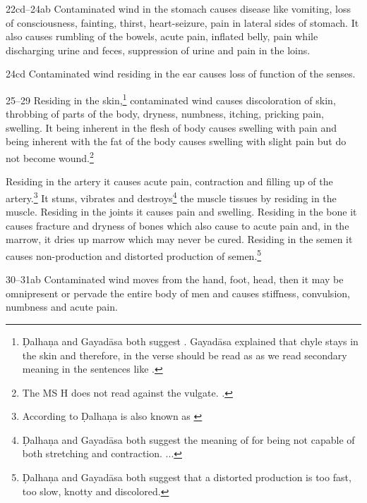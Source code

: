 \begin{translation}
\item[22cd--24ab] Contaminated wind in the stomach causes disease like
vomiting, loss of consciousness, fainting, thirst, heart-seizure, pain in
lateral sides of stomach. It also causes rumbling of the bowels, acute
pain, inflated belly, pain while discharging urine and feces, suppression
of urine and pain in the loins.

\item[24cd]Contaminated wind residing in the ear causes loss of function of the 
senses.

\item[25--29] Residing in the skin,\footnote{Ḍalhaṇa and Gayadāsa both 
suggest . Gayadāsa explained that chyle stays in the skin and 
therefore, in the verse  should be read as  as we read 
secondary meaning in the sentences like .} contaminated 
wind causes discoloration of skin, throbbing of parts of the body, dryness, 
numbness, itching, pricking pain, swelling. It being inherent in the flesh of body 
causes swelling with pain and being inherent with the fat of the body causes 
swelling with slight pain but do not become wound.\footnote{The MS H does 
not 
read  against the vulgate. 
\citep[261]{vulgate}.}

Residing in the artery it causes acute pain, contraction and filling up of the 
artery.\footnote{According to Ḍalhaṇa  is also known as 
 \citep[262]{vulgate}} It stuns, vibrates and 
destroys\footnote{Ḍalhaṇa and Gayadāsa both suggest the meaning of 
 for being not capable of both stretching and contraction. 
 \citep[262]{vulgate} 
...} 
the muscle tissues by residing in the muscle. Residing in the joints it causes 
pain 
and swelling. Residing in the bone it causes fracture and dryness of bones 
which 
also cause to acute pain and, in the marrow, it dries up marrow which may 
never 
be cured. Residing in the semen it causes non-production and distorted 
production of semen.\footnote{Ḍalhaṇa and Gayadāsa both suggest that a 
distorted production  is too fast, too slow, knotty and 
discolored.} 


\item[30--31ab] Contaminated wind moves from the hand, foot, head, then it 
may be omnipresent or pervade the entire body of men and causes stiffness, 
convulsion, numbness and acute pain.


\end{translation}
